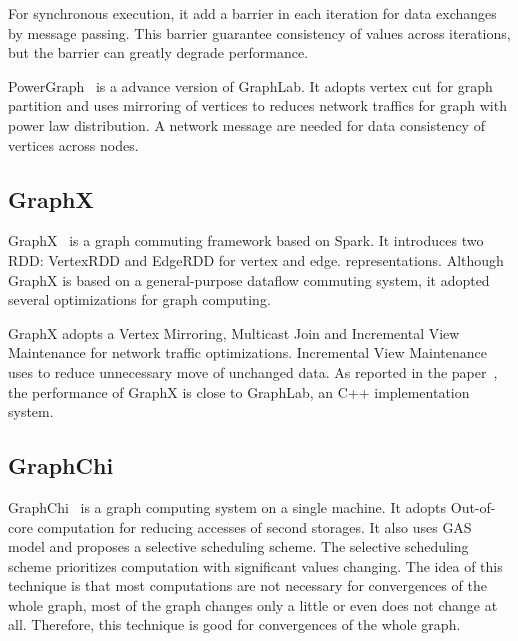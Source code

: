 For synchronous execution, it add a barrier in each
iteration for data exchanges by message passing.
This barrier guarantee consistency of values across
iterations, but the barrier can greatly degrade performance.

PowerGraph~\cite{powergraph} is a advance version of GraphLab.
It adopts vertex cut for graph partition and uses mirroring
of vertices to reduces network traffics for graph with power
law distribution. A network message are needed for data consistency of
vertices across nodes.

\subsection{GraphX}
GraphX~\cite{graphx} is a graph commuting framework based on Spark.
It introduces two RDD: VertexRDD and EdgeRDD for vertex and edge.
representations. Although GraphX is based on a general-purpose
dataflow commuting system, it adopted several optimizations for
graph computing.

GraphX adopts a Vertex Mirroring, Multicast Join and Incremental
View Maintenance
for network traffic optimizations.
Incremental View Maintenance uses to reduce unnecessary
move of unchanged data. As reported in the paper~\cite{graphx},
the performance of GraphX is close to GraphLab, an C++ implementation
system.

\subsection{GraphChi}
GraphChi~\cite{graphchi} is a graph computing system on a single machine.
It adopts Out-of-core computation for reducing accesses of second storages.
It also uses GAS model and proposes a selective scheduling scheme.
The selective scheduling scheme prioritizes computation with significant
values changing. The idea of this technique is that
most computations are not necessary for convergences of the whole graph,
most of the graph changes only a little or even does not change at all.
Therefore, this technique is good for convergences of the whole graph.
